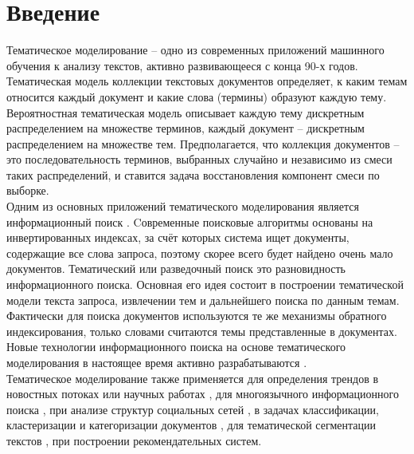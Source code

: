 \documentclass[12pt]{article}
\renewcommand{\baselinestretch}{1.4}
\begin{document}
	\tableofcontents
	\newpage
	\renewcommand{\baselinestretch}{1.5}
	\section{Введение}
Тематическое моделирование -- одно из современных приложений машинного обучения к анализу текстов, активно развивающееся с конца 90-х годов. Тематическая модель коллекции текстовых документов определяет, к каким темам относится каждый документ и какие слова (термины) образуют каждую тему.\\
Вероятностная тематическая модель описывает каждую тему дискретным распределением на множестве терминов, каждый документ -- дискретным распределением на множестве тем. Предполагается, что коллекция документов -- это последовательность терминов, выбранных случайно и независимо из смеси таких распределений, и ставится задача восстановления компонент смеси по выборке.\\
Одним из основных приложений тематического моделирования является информационный поиск \cite{inforetr}. Cовременные поисковые алгоритмы основаны на инвертированных индексах, за счёт которых система ищет документы, содержащие все слова запроса, поэтому скорее всего будет найдено очень мало документов. Тематический или разведочный поиск это разновидность информационного поиска. Основная его идея состоит в построении тематической модели текста запроса, извлечении тем и дальнейшего поиска по данным темам. Фактически для поиска документов используются те же механизмы обратного индексирования, только словами считаются темы представленные в документах. Новые технологии информационного поиска на основе тематического моделирования в настоящее время активно разрабатываются \cite{inforetrtm1, inforetrtm2}.\\
Тематическое моделирование также применяется для определения трендов в новостных потоках или научных работах  \cite{textflow1, textflow2}, для многоязычного информационного поиска  \cite{multilang1, multilang2}, при анализе структур социальных сетей \cite{socnet1, socnet2},  в задачах классификации, кластеризации и категоризации документов \cite{tmtask1, tmtask2}, для тематической сегментации текстов \cite{segtask}, при построении рекомендательных систем\cite{recsys1, recsys2}.
\end{document}
